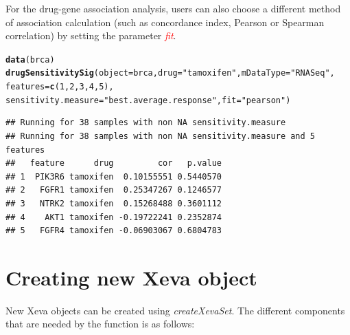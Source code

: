 \documentclass{article}\usepackage[]{graphicx}\usepackage[]{xcolor}
\makeatletter
\newcommand{\hlnum}[1]{\textcolor[rgb]{0.686,0.059,0.569}{#1}}%
\newcommand{\hlstr}[1]{\textcolor[rgb]{0.192,0.494,0.8}{#1}}%
\newcommand{\hlstd}[1]{\textcolor[rgb]{0.345,0.345,0.345}{#1}}%
\newcommand{\hlkwc}[1]{\textcolor[rgb]{0.333,0.667,0.333}{#1}}%
\newcommand{\hlkwd}[1]{\textcolor[rgb]{0.737,0.353,0.396}{\textbf{#1}}}%
\newenvironment{kframe}{%
 \def\at@end@of@kframe{}%
 \ifinner\ifhmode%
  \def\at@end@of@kframe{\end{minipage}}%
  \begin{minipage}{\columnwidth}%
 \fi\fi%
 \def\FrameCommand##1{\hskip\@totalleftmargin \hskip-\fboxsep
 \colorbox{shadecolor}{##1}\hskip-\fboxsep
     \hskip-\linewidth \hskip-\@totalleftmargin \hskip\columnwidth}%
 \MakeFramed {\advance\hsize-\width
   \@totalleftmargin\z@ \linewidth\hsize
   \@setminipage}}%
 {\par\unskip\endMakeFramed%
 \at@end@of@kframe}
\newenvironment{knitrout}{}{} %
\makeatother
\begin{document}
For the drug-gene association analysis, users can also choose a different method
of association calculation (such as concordance index, Pearson or Spearman
correlation) by setting the parameter \textit{\textcolor{red}{fit}}.
\begin{knitrout}
\color{fgcolor}\begin{kframe}
\begin{alltt}
\hlkwd{data}\hlstd{(brca)}
\hlkwd{drugSensitivitySig}\hlstd{(}\hlkwc{object}\hlstd{=brca,} \hlkwc{drug}\hlstd{=}\hlstr{"tamoxifen"}\hlstd{,} \hlkwc{mDataType}\hlstd{=}\hlstr{"RNASeq"}\hlstd{,}
                   \hlkwc{features}\hlstd{=}\hlkwd{c}\hlstd{(}\hlnum{1}\hlstd{,}\hlnum{2}\hlstd{,}\hlnum{3}\hlstd{,}\hlnum{4}\hlstd{,}\hlnum{5}\hlstd{),}
                   \hlkwc{sensitivity.measure}\hlstd{=}\hlstr{"best.average.response"}\hlstd{,} \hlkwc{fit}\hlstd{=}\hlstr{"pearson"}\hlstd{)}
\end{alltt}
\begin{verbatim}
## Running for 38 samples with non NA sensitivity.measure
## Running for 38 samples with non NA sensitivity.measure and 5 features
##   feature      drug         cor   p.value
## 1  PIK3R6 tamoxifen  0.10155551 0.5440570
## 2   FGFR1 tamoxifen  0.25347267 0.1246577
## 3   NTRK2 tamoxifen  0.15268488 0.3601112
## 4    AKT1 tamoxifen -0.19722241 0.2352874
## 5   FGFR4 tamoxifen -0.06903067 0.6804783
\end{verbatim}
\end{kframe}
\end{knitrout}

\section{Creating new Xeva object}
New Xeva objects can be created using \textit{createXevaSet}. The different components that are needed by the function is as follows:
\end{document}
